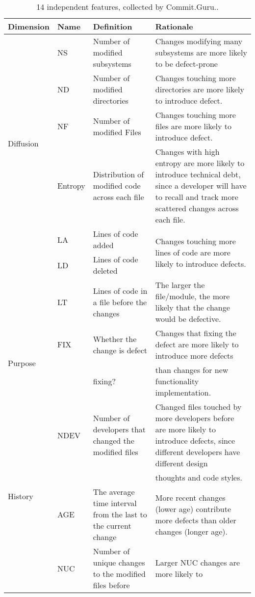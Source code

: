 \begin{table*}[!t]
\centering
\caption{14 independent features, collected by Commit.Guru.\cite{kamei12_jit}.}
\label{tbl:metrics}
\begin{tabular}{l|l|p{4.3cm}|p{9cm}}
\hline
\rowcolor{gray!40}Dimension & Name & Definition & Rationale \\\hline
\multirow{5}{*}{Diffusion} & NS & Number of modified subsystems & Changes modifying many subsystems are more likely to be defect-prone \\\cline{2-4}
& ND & Number of modified directories & Changes touching more directories
are more likely to introduce defect. \\\cline{2-4}
& NF & Number of modified Files & Changes touching more files
are more likely to introduce defect. \\\cline{2-4}
& Entropy & Distribution of modified code across each file & Changes with high entropy are more
likely to introduce technical debt, since a developer will
have to recall and track more scattered changes across
each file. \\\hline
\multirow{3}{*}{Size} & LA & Lines of code added & \multirow{2}{*}{Changes touching more lines of code are more likely to introduce defects.} \\\cline{2-3}
& LD & Lines of code deleted & \\\cline{2-4}
& LT & Lines of code in a file before the changes & The larger the file/module, the more likely that the change would be defective. \\\hline
\multirow{2}{*}{Purpose}  & FIX & Whether the change is defect  & Changes that fixing the defect are more likely to introduce more defects \\
& & fixing? & than changes for new functionality implementation. \\\hline
\multirow{5}{*}{History} & NDEV & Number of developers that changed the modified files & Changed files touched by more developers before are more likely to introduce defects, since different developers have different design \\
& &  &  thoughts and code styles. \\\cline{2-4}
& AGE & The average time interval from the last to the current change & More recent changes (lower age) contribute more defects than older changes (longer age). \\\cline{2-4} 
& NUC & Number of unique changes to the modified files before & Larger NUC changes are more likely to

\end{tabular}
\end{table*}
